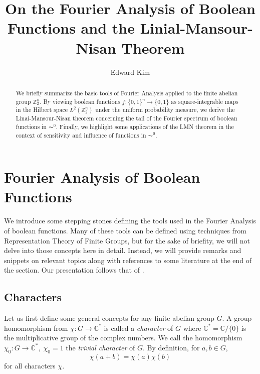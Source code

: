 \documentclass{amsart}
\theoremstyle{definition}
\theoremstyle{remark}
\numberwithin{equation}{section}
\theoremstyle{remark}
\begin{document}
\title{On the Fourier Analysis of Boolean Functions and the Linial-Mansour-Nisan Theorem}

\author{Edward Kim}

\begin{abstract}
  We briefly summarize the basic tools of Fourier Analysis applied to the finite abelian group $\mathbb{Z}_2^n$. By viewing boolean functions $f:\{0,1\}^n \rightarrow \{0,1\}$ as square-integrable maps in the Hilbert space $L^2(\mathbb{Z}_2^n)$ under the uniform probability measure, we derive the Linai-Mansour-Nisan theorem concerning the tail of the Fourier spectrum of boolean functions in $\AC^0$. Finally, we highlight some applications of the LMN theorem in the context of sensitivity and influence of functions in $\AC^0$.
\end{abstract}

\maketitle

\section{Fourier Analysis of Boolean Functions}


We introduce some stepping stones defining the tools used in the Fourier Analysis of boolean functions. Many of these tools can be defined using techniques from Representation Theory of Finite Groups, but for the sake of briefity, we will not delve into those concepts here in detail. Instead, we will provide remarks and snippets on relevant topics along with references to some literature at the end of the section. Our presentation follows that of \cite{hatami}. \newline

\subsection{Characters}
Let us first define some general concepts for any finite abelian group $G$. A group homomorphism from $\chi: G \rightarrow \mathbb{C}^*$ is called a \emph{character} of $G$ where $\mathbb{C}^* = \mathbb{C}/\{0\}$ is the multiplicative group of the complex numbers. We call the homomorphism $\chi_0:G \rightarrow \mathbb{C}^*, \; \chi_0 = 1$ the \emph{trivial character} of $G$. By definition, for $a,b \in G$,
\begin{equation} \label{homo}
\chi(a + b) = \chi(a)\chi(b)
\end{equation}
for all characters $\chi$. \newline
\end{document}
